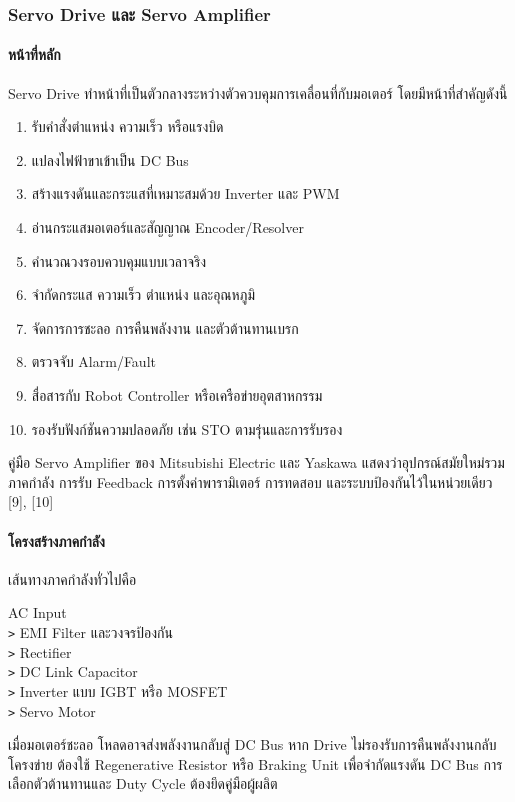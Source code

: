 \subsubsection{Servo Drive และ Servo Amplifier}

\paragraph{หน้าที่หลัก}

Servo Drive ทำหน้าที่เป็นตัวกลางระหว่างตัวควบคุมการเคลื่อนที่กับมอเตอร์ โดยมีหน้าที่สำคัญดังนี้

\begin{enumerate}
    \item รับคำสั่งตำแหน่ง ความเร็ว หรือแรงบิด
    \item แปลงไฟฟ้าขาเข้าเป็น DC Bus
    \item สร้างแรงดันและกระแสที่เหมาะสมด้วย Inverter และ PWM
    \item อ่านกระแสมอเตอร์และสัญญาณ Encoder/Resolver
    \item คำนวณวงรอบควบคุมแบบเวลาจริง
    \item จำกัดกระแส ความเร็ว ตำแหน่ง และอุณหภูมิ
    \item จัดการการชะลอ การคืนพลังงาน และตัวต้านทานเบรก
    \item ตรวจจับ Alarm/Fault
    \item สื่อสารกับ Robot Controller หรือเครือข่ายอุตสาหกรรม
    \item รองรับฟังก์ชันความปลอดภัย เช่น STO ตามรุ่นและการรับรอง
\end{enumerate}

คู่มือ Servo Amplifier ของ Mitsubishi Electric และ Yaskawa แสดงว่าอุปกรณ์สมัยใหม่รวมภาคกำลัง การรับ Feedback การตั้งค่าพารามิเตอร์ การทดสอบ และระบบป้องกันไว้ในหน่วยเดียว [9], [10]

\paragraph{โครงสร้างภาคกำลัง}

เส้นทางภาคกำลังทั่วไปคือ

AC Input \\
\texttt{>} EMI Filter และวงจรป้องกัน \\
\texttt{>} Rectifier \\
\texttt{>} DC Link Capacitor \\
\texttt{>} Inverter แบบ IGBT หรือ MOSFET \\
\texttt{>} Servo Motor

เมื่อมอเตอร์ชะลอ โหลดอาจส่งพลังงานกลับสู่ DC Bus หาก Drive ไม่รองรับการคืนพลังงานกลับโครงข่าย ต้องใช้ Regenerative Resistor หรือ Braking Unit เพื่อจำกัดแรงดัน DC Bus การเลือกตัวต้านทานและ Duty Cycle ต้องยึดคู่มือผู้ผลิต

